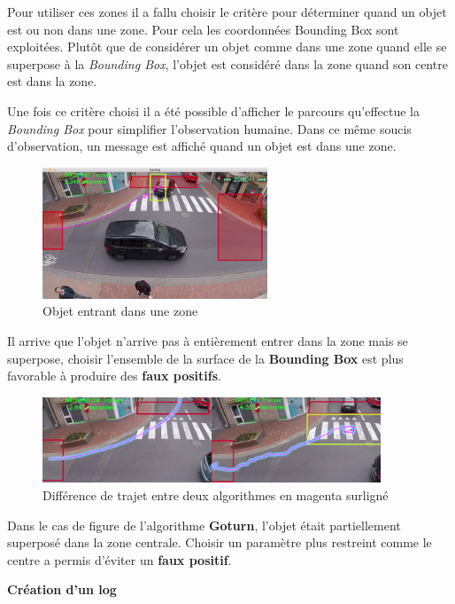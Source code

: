 Pour utiliser ces zones il a fallu choisir le critère pour déterminer quand un objet est ou non dans une zone. Pour cela les coordonnées Bounding Box sont exploitées. Plutôt que de considérer un objet comme dans une zone quand elle se superpose à la \textit{Bounding Box}, l'objet est considéré dans la zone quand son centre est dans la zone. 

Une fois ce critère choisi il a été possible d'afficher le parcours qu'effectue la \textit{Bounding Box} pour simplifier l'observation humaine. Dans ce même soucis d’observation, un message est affiché quand un objet est dans une zone. 

\begin{figure}[H]
  \includegraphics[width=0.6\textwidth]{img/ALGOZONE.png}
    \centering
    \caption{Objet entrant dans une zone}
\end{figure}

Il arrive que l'objet n'arrive pas à entièrement entrer dans la zone mais se superpose, choisir l'ensemble de la surface de la \textbf{Bounding Box} est plus favorable à produire des \textbf{faux positifs}.

\begin{figure}[H]
  \includegraphics[width=0.9\textwidth]{img/path.png}
    \centering
    \caption{Différence de trajet entre deux algorithmes en magenta surligné}
\end{figure}

Dans le cas de figure de l'algorithme \textbf{Goturn}, l'objet était partiellement superposé dans la zone centrale. Choisir un paramètre plus restreint comme le centre a permis d'éviter un \textbf{faux positif}. 

\textbf{Création d'un log}

